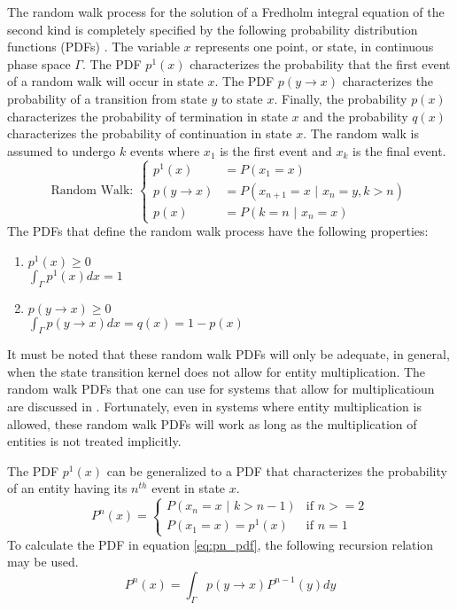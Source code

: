 The random walk process for the solution of a Fredholm integral equation of
the second kind is completely specified by the following probability
distribution functions (PDFs) \citep{spanier_monte_1969}. The variable $x$ 
represents one point, or state, in continuous phase space $\Gamma$. The 
PDF $p^1(x)$ characterizes the probability that the first event of a random 
walk will occur in state $x$. The PDF $p(y \to x)$ characterizes the probability
of a transition from state $y$ to state $x$. Finally, the probability $p(x)$
characterizes the probability of termination in state $x$ and the probability
$q(x)$ characterizes the probability of continuation in state $x$. The random 
walk is assumed to undergo $k$ events where $x_1$ is the first event and $x_k$ 
is the final event.
\begin{equation}
  \text{Random Walk: }
  \begin{cases}
    p^1(x) & = P(x_1 = x) \\
    p(y \to x) & = P(x_{n+1} = x \text{ | } x_n = y, k > n)  \\
    p(x) & = P(k = n \text{ | } x_n = x) 
  \end{cases}
  \label{eq:mc_random_walk_pdfs}
\end{equation}
The PDFs that define the random walk process have the following properties:
\begin{enumerate}
  \item $p^1(x) \geq 0$ \\
  $\int_{\Gamma} p^1(x)dx = 1$
  \item $p(y \to x) \geq 0$ \\
  $\int_{\Gamma} p(y \to x)dx = q(x) = 1 - p(x)$
\end{enumerate}
It must be noted that these random walk PDFs will only be adequate, in general,
when the state transition kernel does not allow for entity multiplication. The
random walk PDFs that one can use for systems that allow for multiplicatioun 
are discussed in \citep{spanier_monte_1969}. Fortunately, even in systems where 
entity multiplication is allowed, these random walk PDFs will work as long as 
the multiplication of entities is not treated implicitly. 

The PDF $p^1(x)$ can be generalized to a PDF that characterizes the probability 
of an entity having its $n^{th}$ event in state $x$. 
\begin{equation}
  P^n(x) = 
  \begin{cases} 
    P(x_n = x \text{ | } k > n-1) & \text{if } n >= 2 \\
    P(x_1 = x) = p^1(x) & \text{if } n = 1 
  \end{cases}
  \label{eq:pn_pdf}
\end{equation}
To calculate the PDF in equation \ref{eq:pn_pdf}, the following recursion
relation may be used.
\begin{equation}
  P^n(x) = \int_{\Gamma} p(y \to x) P^{n-1}(y)dy
  \label{eq:pn_recursion_rel}
\end{equation}


